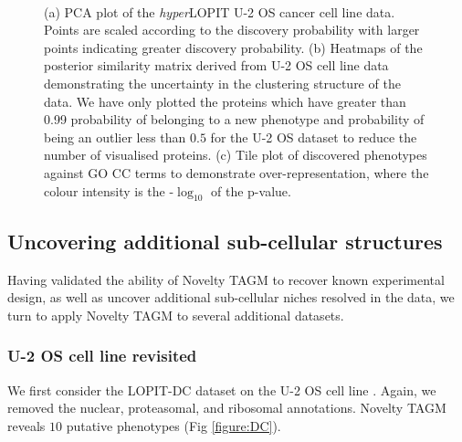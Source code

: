 \documentclass[12pt,english]{article}
\begin{document}
\begin{figure}[ht]
	\begin{subfigure}[t]{0.5\textwidth}
	\centering
	\caption{}
\end{subfigure}
\begin{subfigure}[t]{0.5\textwidth}
	\centering
	\caption{}
\end{subfigure}
~
\begin{subfigure}[t]{\textwidth}
	\centering
	\caption{}
\end{subfigure}
	\caption{(a) PCA plot of the \textit{hyper}LOPIT U-2 OS cancer cell line data. Points are scaled according to the discovery probability with larger points indicating greater discovery probability. (b) Heatmaps of the posterior similarity matrix derived from U-2 OS cell line data demonstrating the uncertainty in the clustering structure of the data. We have only plotted the proteins which have greater than 0.99 probability of belonging to a new phenotype and probability of being an outlier less than $0.5$ for the U-2 OS dataset to reduce the number of visualised proteins. (c) Tile plot of discovered phenotypes against GO CC terms to demonstrate over-representation, where the colour intensity is the -$\log_{10}$ of the p-value.}
	\label{figure:chromatin}
\end{figure}
\clearpage
\subsection*{Uncovering additional sub-cellular structures}
Having validated the ability of Novelty TAGM to recover known experimental design, as well as uncover additional sub-cellular niches resolved in the data, we turn to apply Novelty TAGM to several additional datasets.

\subsubsection*{U-2 OS cell line revisited}
 We first consider the LOPIT-DC dataset on the U-2 OS cell line \citep{DC:2018}. Again, we removed the nuclear, proteasomal, and ribosomal annotations. Novelty TAGM reveals $10$ putative phenotypes (Fig \ref{figure:DC}).
\end{document}
